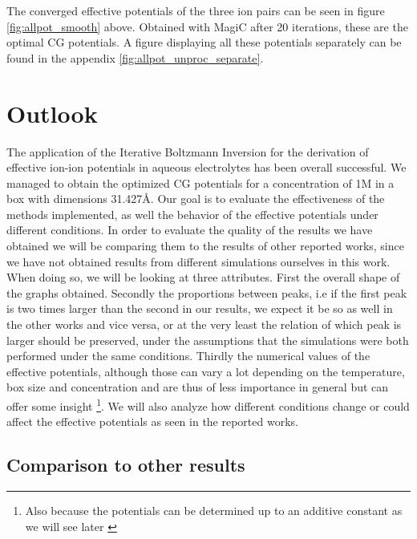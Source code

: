 \documentclass[10pt]{article}
\begin{document}
        The converged effective potentials of the three ion pairs can be seen in figure \ref{fig:allpot_smooth} above. Obtained with MagiC after 20 iterations, these are the optimal CG potentials. A figure displaying all these potentials separately can be found in the appendix \ref{fig:allpot_unproc_separate}.



\section{Outlook}

    The application of the Iterative Boltzmann Inversion for the derivation of effective ion-ion potentials in aqueous electrolytes has been overall successful. We managed to obtain the optimized CG potentials for a concentration of 1M in a box with dimensions 31.427$\si{\angstrom}$. Our goal is to evaluate the effectiveness of the methods implemented, as well the behavior of the effective potentials under different conditions. In order to evaluate the quality of the results we have obtained we will be comparing them to the results of other reported works, since we have not obtained results from different simulations ourselves in this work. When doing so, we will be looking at three attributes. First the overall shape of the graphs obtained. Secondly the proportions between peaks, i.e if the first peak is two times larger than the second in our results, we expect it be so as well in the other works and vice versa, or at the very least the relation of which peak is larger should be preserved, under the assumptions that the simulations were both performed under the same conditions. Thirdly the numerical values of the effective potentials, although those can vary a lot depending on the temperature, box size and concentration and are thus of less importance in general but can offer some insight \footnote{Also because the potentials can be determined up to an additive constant as we will see later \cite{Ruhle}}. We will also analyze how different conditions change or could affect the effective potentials as seen in the reported works.

    
    \label{outlook}
    \subsection{Comparison to other results}
\end{document}

